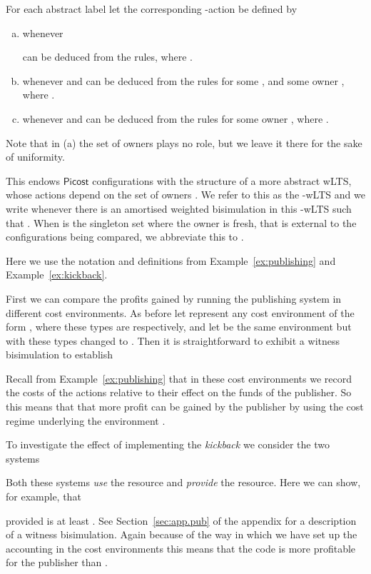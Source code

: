 \documentclass{LMCS}
\newcommand{\pfn}[1]{\mathsf{#1}}  \newcommand{\cfn}[1]{\mathsf{#1}}  \newcommand{\ownfnt}[1]{{\mathsf{#1}}}
\newcommand{\picost}{\ensuremath{\pfn{Picost}}\xspace}
\newcommand{\EndDefBox}{\null\hfill}
\newcommand{\boxHere}{\global\let\EndProof\empty\EndDefBox}
\begin{document}
\begin{defi}[-actions]\label{def:aa}
  For each abstract label  let the corresponding -action  be defined by
\begin{enumerate}[(a)]

\item  whenever 
  
can be deduced from the rules, where .


\item 
  whenever    and  can be deduced from the rules for some
  , and some owner ,
where .


\item 
  whenever   and  can be deduced from the rules for  some owner ,
where .
\end{enumerate}
Note that in (a) the set of owners  plays no role, but we leave it
there for the sake of uniformity. \boxHere
\end{defi}

\noindent
This endows \picost configurations with the structure of a more
abstract wLTS, whose actions depend on the set of owners .  We
refer to this as the -wLTS and we write  whenever there is an amortised weighted bisimulation
 in this -wLTS such that .  When  is the singleton set 
where the owner  is fresh, that is  external to the
configurations being compared, we abbreviate this to .



\begin{exa}\label{ex:publishingagain}
Here we use the notation and definitions from Example~\ref{ex:publishing} and Example~\ref{ex:kickback}.

First we can compare the profits gained by running the publishing system in different
cost environments. As before  let  represent any cost environment of the
form 
, where these types are
 respectively, and let  be the same environment
but with these types changed to . Then it is straightforward to 
exhibit a witness bisimulation to establish

 Recall from Example~\ref{ex:publishing} that in these cost environments we record the costs of the
actions relative to their effect on the funds of  the publisher. So this means that 
that more profit can be gained by the publisher  by using the cost regime underlying the environment
.

To investigate the effect of implementing the \emph{kickback} we consider the two systems

Both these systems \emph{use} the  resource and \emph{provide} the  resource.
Here we can show, for example, that 

provided  is at least . See Section~\ref{sec:app.pub} of the appendix for a description of a witness
bisimulation. Again because of the way in which we have set up the accounting in the cost environments this means 
that the code  is more profitable for the publisher 
than . 
\boxHere 
\end{exa}
\end{document}

